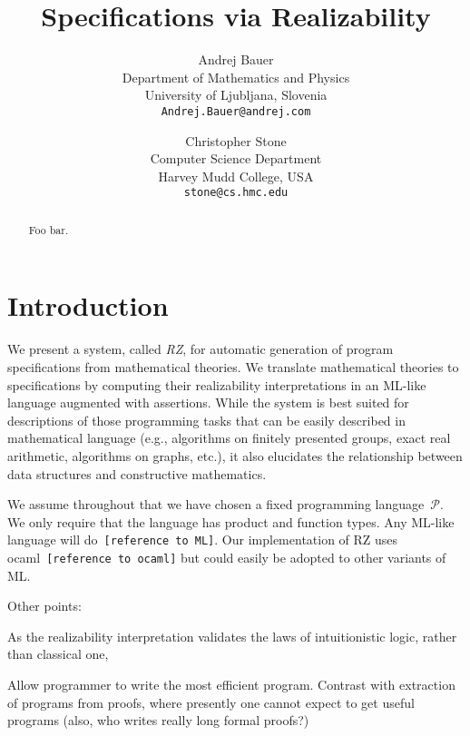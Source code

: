 \documentclass{article}
\newcommand{\PL}{\mathcal{P}}
\newcommand{\note}[1]{\texttt{[#1]}}
\begin{document}
\twocolumn

\title{Specifications via Realizability}

\author{
  Andrej Bauer\\
  {\small Department of Mathematics and Physics}\\
  {\small University of Ljubljana, Slovenia}\\
  {\small \texttt{Andrej.Bauer@andrej.com}}
  \and
  Christopher Stone\\
  {\small Computer Science Department}\\
  {\small Harvey Mudd College, USA}\\
  {\small \texttt{stone@cs.hmc.edu}}
}

\maketitle

\begin{abstract}
  Foo bar.
\end{abstract}

\section{Introduction}
\label{sec:introduction}

We present a system, called \emph{RZ}, for automatic generation of
program specifications from mathematical theories. We translate
mathematical theories to specifications by computing their
realizability interpretations in an ML-like language augmented with
assertions. While the system is best suited for descriptions of those
programming tasks that can be easily described in mathematical
language (e.g., algorithms on finitely presented groups, exact real
arithmetic, algorithms on graphs, etc.), it also elucidates the
relationship between data structures and constructive mathematics.

We assume throughout that we have chosen a fixed programming
language~$\PL$. We only require that the language has product and
function types. Any ML-like language will do~\note{reference to ML}.
Our implementation of RZ uses ocaml~\note{reference to ocaml} but
could easily be adopted to other variants of ML.


Other points:

As the realizability interpretation validates the laws of
intuitionistic logic, rather than classical one, 


Allow programmer to write the most efficient program. Contrast with
extraction of programs from proofs, where presently one cannot expect
to get useful programs (also, who writes really long formal proofs?)
\end{document}
